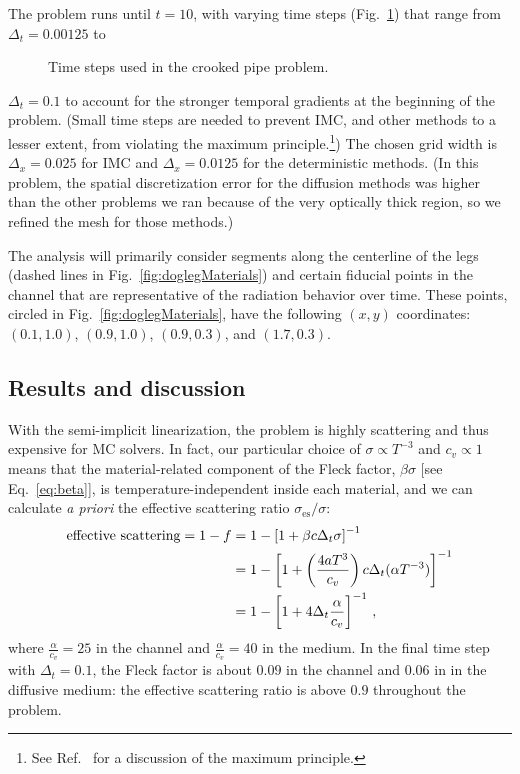 The problem runs until $t=10$, with varying time steps
(Fig.~\ref{fig:doglegTimestep}) that range from $\Delta_t=0.00125$ to
%
\begin{figure}[htb]
  \centering
  
  \caption{Time steps used in the crooked pipe problem.}
  \label{fig:doglegTimestep}
\end{figure}
%
$\Delta_t=0.1$ to account for the stronger temporal gradients
at the beginning of the problem. (Small time steps are needed
to prevent IMC, and other methods to a lesser extent, from violating the maximum
principle.\footnote{%
See Ref.~\cite{Lar1987} for a discussion of the maximum principle.
})
The chosen grid width is $\Delta_x = 0.025$ for IMC and $\Delta_x = 0.0125$
for the deterministic methods. (In this problem, the spatial discretization
error for the diffusion methods was higher than the other problems
we ran because of the very optically thick region, so we refined the mesh for
those methods.)


The analysis will primarily consider segments along the centerline of the legs
(dashed lines
in Fig.~\ref{fig:doglegMaterials}) and certain fiducial points in the channel
that are representative of the radiation behavior over time. These points,
circled in Fig.~\ref{fig:doglegMaterials}, have the following  $(x,y)$
coordinates: $(0.1, 1.0)$, $(0.9, 1.0)$, $(0.9, 0.3)$, and $(1.7, 0.3)$.

\subsection{Results and discussion}

With the semi-implicit linearization, the problem is highly scattering and
thus expensive for MC solvers. In fact, our particular choice of $\sigma
\propto T^{-3}$ and $c_v \propto 1$ means that the material-related component
of the Fleck
factor, $\beta \sigma$ [see Eq.~\eqref{eq:beta}], is
temperature-independent inside each material, and we can calculate \emph{a
priori} the effective scattering ratio $\sigma_\text{es}/\sigma$:
\begin{align*}
  \text{effective scattering} = 1 - f
  &= 1 - \left[ 1 + \beta c \Delta_t \sigma \right]^{-1}
  \\
  &= 1 -  \left[ 1 +\left(  \frac{4 a T^3}{ c_v } \right) c \Delta_t (\alpha T^{-3}) \right]^{-1}
  \\
  &= 1 - \left[ 1 + 4 \Delta_t \frac{\alpha}{c_v} \right]^{-1}\,,
\end{align*}
where $\frac{\alpha}{c_v} = 25$ in the channel and $\frac{\alpha}{c_v} = 40$ in
the medium. In the final time step with $\Delta_t=0.1$, the Fleck factor is
about $0.09$ in the channel and $0.06$ in in the
diffusive medium: the effective scattering ratio is above $0.9$ throughout the
problem.

